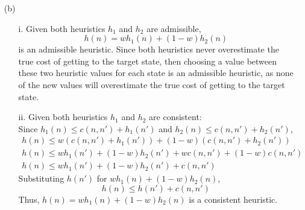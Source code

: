 \documentclass[11pt]{article}
\begin{document}
\begin{enumerate}
        \item[(b)]
            \begin{enumerate}
                \item[i.] Given both heuristics $h_1$ and $h_2$ are admissible,
                \[h(n) = wh_1(n)+(1-w)h_2(n)\] is an admissible heuristic.
                Since both heuristics never overestimate the true cost of getting to the target state, then choosing
                a value between these two heuristic values for each state is an admissible heuristic, as none of the
                new values will overestimate the true cost of getting to the target state.
                \item[ii.] Given both heuristics $h_1$ and $h_2$ are consistent: \\
                Since $h_1(n) \leq c(n, n') + h_1(n')$ and $h_2(n) \leq c(n, n') + h_2(n')$,
                \begin{gather*}
                    h(n) \leq w\left(c(n, n') + h_1(n')\right)+(1-w)\left(c(n, n') + h_2(n')\right)\\
                    h(n) \leq wh_1(n')+(1-w)h_2(n') + wc(n, n') + (1-w)c(n, n')\\
                    h(n) \leq wh_1(n')+(1-w)h_2(n') + c(n, n')
                \end{gather*}
                Substituting $h(n')$ for $wh_1(n)+(1-w)h_2(n)$,
                \[h(n) \leq h(n') + c(n, n')\]
                Thus, $h(n) = wh_1(n)+(1-w)h_2(n)$ is a consistent heuristic.
            \end{enumerate}


\end{enumerate}
\end{document}
